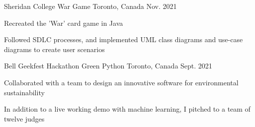 \begin{cventries}
  \cventry
    {Sheridan College}
    {War Game}
    {Toronto, Canada}
    {Nov. 2021}
    {
      \begin{cvitems}
        \item {Recreated the 'War' card game in Java 
        \item Followed SDLC processes, and implemented UML class diagrams and use-case diagrams to create user scenarios}
      \end{cvitems}
    }
  \cventry
    {Bell Geekfest Hackathon}
    {Green Python}
    {Toronto, Canada}
    {Sept. 2021}
    {
      \begin{cvitems}
        \item {Collaborated with a team to design an innovative software for environmental sustainability
        \item In addition to a live working demo with machine learning, I pitched to a team of twelve judges}      \end{cvitems}
    }
\end{cventries}
